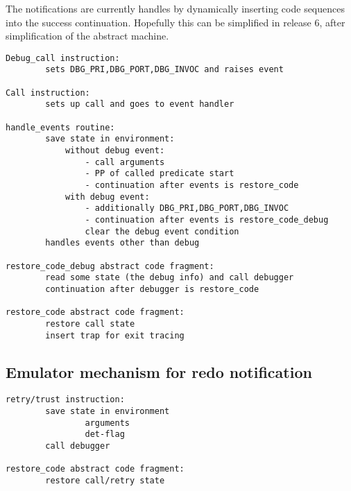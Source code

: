 The notifications are currently handles by dynamically inserting 
code sequences into the success continuation. Hopefully this
can be simplified in release 6, after
simplification of the abstract machine.
\begin{small}
\begin{verbatim}
Debug_call instruction:
        sets DBG_PRI,DBG_PORT,DBG_INVOC and raises event

Call instruction:
        sets up call and goes to event handler

handle_events routine:
        save state in environment:
            without debug event:
                - call arguments
                - PP of called predicate start
                - continuation after events is restore_code
            with debug event:
                - additionally DBG_PRI,DBG_PORT,DBG_INVOC
                - continuation after events is restore_code_debug
                clear the debug event condition
        handles events other than debug

restore_code_debug abstract code fragment:
        read some state (the debug info) and call debugger
        continuation after debugger is restore_code

restore_code abstract code fragment:
        restore call state
        insert trap for exit tracing
\end{verbatim}
\end{small}


\subsection{Emulator mechanism for redo notification}
\begin{small}
\begin{verbatim}
retry/trust instruction:
        save state in environment
                arguments
                det-flag
        call debugger

restore_code abstract code fragment:
        restore call/retry state
\end{verbatim}
\end{small}


%
%


